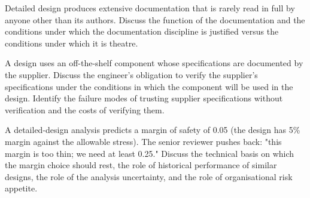 \begin{exercise}
Detailed design produces extensive documentation that is rarely read in full by anyone other than its authors. Discuss the function of the documentation and the conditions under which the documentation discipline is justified versus the conditions under which it is theatre.
\end{exercise}

\begin{exercise}
A design uses an off-the-shelf component whose specifications are documented by the supplier. Discuss the engineer's obligation to verify the supplier's specifications under the conditions in which the component will be used in the design. Identify the failure modes of trusting supplier specifications without verification and the costs of verifying them.
\end{exercise}

\begin{exercise}
A detailed-design analysis predicts a margin of safety of 0.05 (the design has 5\% margin against the allowable stress). The senior reviewer pushes back: "this margin is too thin; we need at least 0.25." Discuss the technical basis on which the margin choice should rest, the role of historical performance of similar designs, the role of the analysis uncertainty, and the role of organisational risk appetite.
\end{exercise}
